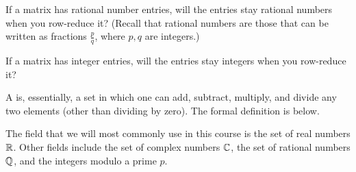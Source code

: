 \endedxproblem


If a matrix has rational number entries, will the entries stay rational numbers when you 
row-reduce it?  (Recall that rational numbers are those that can be written as fractions
$\frac{p}{q}$,
where $p,q$ are integers.)  



\endedxproblem


If a matrix has integer entries, will the entries stay integers when you 
row-reduce it?  



\endedxproblem




\endedxvertical





A {} is, essentially, a set in which one can add, subtract, multiply, and
divide any two elements (other than dividing by zero).  The formal definition is below.  

The field that we will
most commonly use in this course is the set of real numbers $\mathbb R$.  Other fields include
the set of complex numbers $\mathbb C$, the set of rational numbers $\mathbb Q$, and the integers modulo
a prime $p$.  


